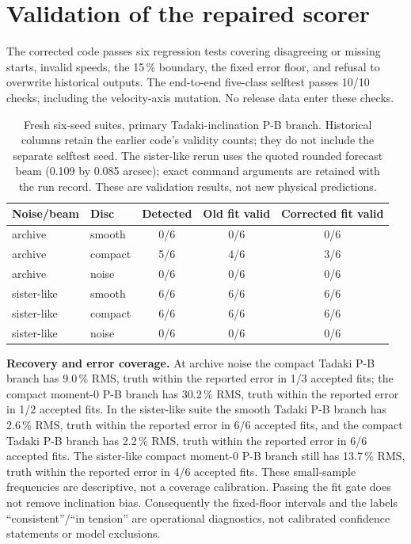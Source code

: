  \section{Validation of the repaired scorer}\label{s:validation}
The corrected code passes six regression tests covering disagreeing or missing starts, invalid speeds, the 15\,\% boundary, the fixed error floor, and refusal to overwrite historical outputs. The end-to-end five-class selftest passes 10/10 checks, including the velocity-axis mutation. No release data enter these checks.

\begin{table}[ht]\centering\small
\caption{Fresh six-seed suites, primary Tadaki-inclination P-B branch. Historical columns retain the earlier code's validity counts; they do not include the separate selftest seed. The sister-like rerun uses the quoted rounded forecast beam (0.109 by 0.085 arcsec); exact command arguments are retained with the run record. These are validation results, not new physical predictions.}
\begin{tabular}{llccc}\toprule
Noise/beam & Disc & Detected & Old fit valid & Corrected fit valid \\ \midrule
archive & smooth & 0/6 & 0/6 & 0/6 \\
archive & compact & 5/6 & 4/6 & 3/6 \\
archive & noise & 0/6 & 0/6 & 0/6 \\
sister-like & smooth & 6/6 & 6/6 & 6/6 \\
sister-like & compact & 6/6 & 6/6 & 6/6 \\
sister-like & noise & 0/6 & 0/6 & 0/6 \\
\bottomrule\end{tabular}\end{table}

\textbf{Recovery and error coverage.} At archive noise the compact Tadaki P-B branch has 9.0\,\% RMS, truth within the reported error in 1/3 accepted fits; the compact moment-0 P-B branch has 30.2\,\% RMS, truth within the reported error in 1/2 accepted fits. In the sister-like suite the smooth Tadaki P-B branch has 2.6\,\% RMS, truth within the reported error in 6/6 accepted fits, and the compact Tadaki P-B branch has 2.2\,\% RMS, truth within the reported error in 6/6 accepted fits. The sister-like compact moment-0 P-B branch still has 13.7\,\% RMS, truth within the reported error in 4/6 accepted fits. These small-sample frequencies are descriptive, not a coverage calibration. Passing the fit gate does not remove inclination bias. Consequently the fixed-floor intervals and the labels ``consistent''/``in tension'' are operational diagnostics, not calibrated confidence statements or model exclusions.

